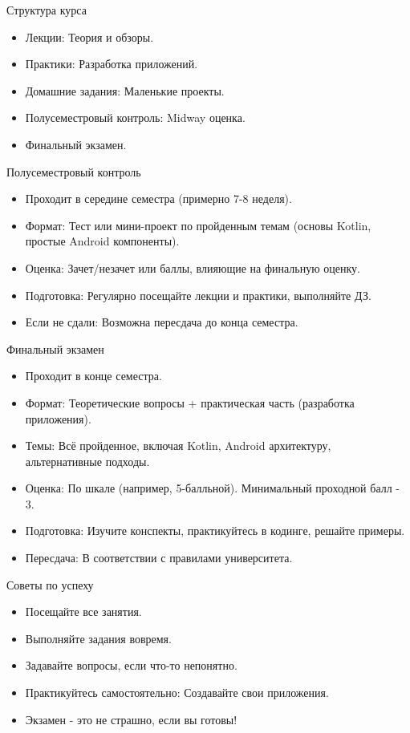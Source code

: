 \documentclass{beamer}
\begin{document}
\begin{frame}{Структура курса}
  \begin{itemize}
    \item Лекции: Теория и обзоры.
    \item Практики: Разработка приложений.
    \item Домашние задания: Маленькие проекты.
    \item Полусеместровый контроль: Midway оценка.
    \item Финальный экзамен.
  \end{itemize}
\end{frame}

\begin{frame}{Полусеместровый контроль}
  \begin{itemize}
    \item Проходит в середине семестра (примерно 7-8 неделя).
    \item Формат: Тест или мини-проект по пройденным темам (основы Kotlin, простые Android компоненты).
    \item Оценка: Зачет/незачет или баллы, влияющие на финальную оценку.
    \item Подготовка: Регулярно посещайте лекции и практики, выполняйте ДЗ.
    \item Если не сдали: Возможна пересдача до конца семестра.
  \end{itemize}
\end{frame}

\begin{frame}{Финальный экзамен}
  \begin{itemize}
    \item Проходит в конце семестра.
    \item Формат: Теоретические вопросы + практическая часть (разработка приложения).
    \item Темы: Всё пройденное, включая Kotlin, Android архитектуру, альтернативные подходы.
    \item Оценка: По шкале (например, 5-балльной). Минимальный проходной балл - 3.
    \item Подготовка: Изучите конспекты, практикуйтесь в кодинге, решайте примеры.
    \item Пересдача: В соответствии с правилами университета.
  \end{itemize}
\end{frame}

\begin{frame}{Советы по успеху}
  \begin{itemize}
    \item Посещайте все занятия.
    \item Выполняйте задания вовремя.
    \item Задавайте вопросы, если что-то непонятно.
    \item Практикуйтесь самостоятельно: Создавайте свои приложения.
    \item Экзамен - это не страшно, если вы готовы!
  \end{itemize}
\end{frame}
\end{document}
